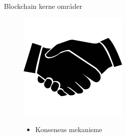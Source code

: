 \documentclass[12pt,t]{beamer}
\begin{document}
\begin{frame}[plain]{Blockchain kerne områder}
		\begin{figure}
		\begin{minipage}[c]{0.1\textwidth}
			\includegraphics[width=\textwidth]{kon.png}
		\end{minipage}
		\begin{minipage}[c]{0.5\textwidth}
			\begin{itemize}
				\item Konsensus mekanisme
			\end{itemize}
		\end{minipage}
	\end{figure}
	\end{frame}
\end{document}
